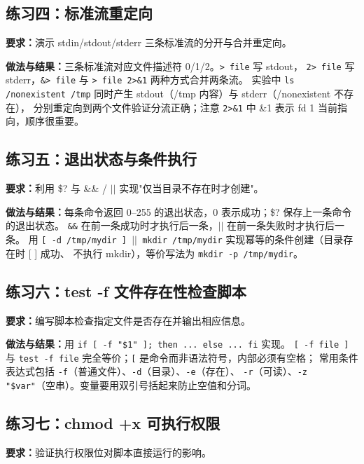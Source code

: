 \documentclass[UTF8]{ctexart}
\begin{document}
\subsection{练习四：标准流重定向}

\noindent\textbf{要求：}演示 stdin/stdout/stderr 三条标准流的分开与合并重定向。

\noindent\textbf{做法与结果：}三条标准流对应文件描述符 0/1/2。\texttt{> file} 写 stdout，
\texttt{2> file} 写 stderr，\texttt{\&> file} 与 \texttt{> file 2>\&1} 两种方式合并两条流。
实验中 \texttt{ls /nonexistent /tmp} 同时产生 stdout（/tmp 内容）与 stderr（/nonexistent 不存在），
分别重定向到两个文件验证分流正确；注意 \texttt{2>\&1} 中 \&1 表示 fd 1 当前指向，顺序很重要。

\subsection{练习五：退出状态与条件执行}

\noindent\textbf{要求：}利用 \$? 与 \&\& / $||$ 实现"仅当目录不存在时才创建"。

\noindent\textbf{做法与结果：}每条命令返回 0--255 的退出状态，0 表示成功；\$? 保存上一条命令的退出状态。
\texttt{\&\&} 在前一条成功时才执行后一条，\texttt{$||$} 在前一条失败时才执行后一条。
用 \texttt{[ -d /tmp/mydir ] $||$ mkdir /tmp/mydir} 实现幂等的条件创建（目录存在时 [ ] 成功、
不执行 mkdir），等价写法为 \texttt{mkdir -p /tmp/mydir}。

\subsection{练习六：test -f 文件存在性检查脚本}

\noindent\textbf{要求：}编写脚本检查指定文件是否存在并输出相应信息。

\noindent\textbf{做法与结果：}用 \texttt{if [ -f "\$1" ]; then ... else ... fi} 实现。
\texttt{[ -f file ]} 与 \texttt{test -f file} 完全等价；\texttt{[} 是命令而非语法符号，内部必须有空格；
常用条件表达式包括 \texttt{-f}（普通文件）、\texttt{-d}（目录）、\texttt{-e}（存在）、
\texttt{-r}（可读）、\texttt{-z "\$var"}（空串）。变量要用双引号括起来防止空值和分词。

\subsection{练习七：chmod +x 可执行权限}

\noindent\textbf{要求：}验证执行权限位对脚本直接运行的影响。
\end{document}
